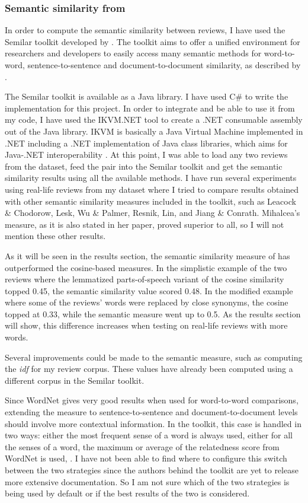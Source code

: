 \subsubsection{Semantic similarity from \citet{Mihalcea2006}}

In order to compute the semantic similarity between reviews, I have used the Semilar toolkit developed by \citet{Rus2013}. The toolkit aims to offer a unified environment for researchers and developers to easily access many semantic methods for word-to-word, sentence-to-sentence and document-to-document similarity, as described by \citet{SEMILAR}.

The Semilar toolkit is available as a Java library. I have used C\# to write the implementation for this project. In order to integrate and be able to use it from my code, I have used the IKVM.NET tool to create a .NET consumable assembly out of the Java library. IKVM is basically a Java Virtual Machine implemented in .NET including a .NET implementation of Java class libraries, which aims for Java-.NET interoperability \citet{IKVMNET}. 
At this point, I was able to load any two reviews from the dataset, feed the pair into the Semilar toolkit and get the semantic similarity results using all the available methods. I have run several experiments using real-life reviews from my dataset where I tried to compare results obtained with other semantic similarity measures included in the toolkit, such as Leacock \& Chodorow, Lesk, Wu \& Palmer, Resnik, Lin, and Jiang \& Conrath. Mihalcea’s measure, as it is also stated in her paper, proved superior to all, so I will not mention these other results.

As it will be seen in the results section, the semantic similarity measure of \citet{Mihalcea2006} has outperformed the cosine-based measures. In the simplistic example of the two reviews where the lemmatized parts-of-speech variant of the cosine similarity topped 0.45, the semantic similarity value scored 0.48. In the modified example where some of the reviews’ words were replaced by close synonyms, the cosine topped at 0.33, while the semantic measure went up to 0.5. As the results section will show, this difference increases when testing on real-life reviews with more words.

Several improvements could be made to the semantic measure, such as computing the \textit{idf} for my review corpus. These values have already been computed using a different corpus in the Semilar toolkit. 

Since WordNet gives very good results when used for word-to-word comparisons, extending the measure to sentence-to-sentence and document-to-document levels should involve more contextual information. In the toolkit, this case is handled in two ways: either the most frequent sense of a word is always used, either for all the senses of a word, the maximum or average of the relatedness score from WordNet is used, \citet{Rus2013}.
I have not been able to find where to configure this switch between the two strategies since the authors behind the toolkit are yet to release more extensive documentation. So I am not sure which of the two strategies is being used by default or if the best results of the two is considered.

